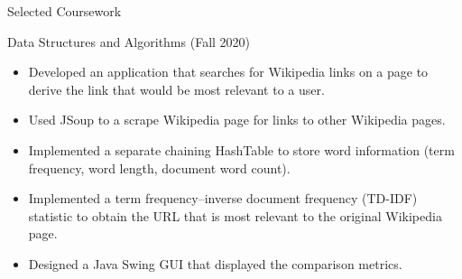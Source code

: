 \documentclass[]{johnsoncv}
\begin{document}
\begin{cvsection}{Selected Coursework}
		\begin{cvsubsection}{Data Structures and Algorithms (Fall 2020)}{}{}
			\begin{itemize}
				\item Developed an application that searches for Wikipedia links on a page to derive the link that would be most relevant to a user.
				\item Used JSoup to a scrape Wikipedia page for links to other Wikipedia pages.
				\item Implemented a separate chaining HashTable to store word information (term frequency, word length, document word count).
				\item Implemented a term frequency–inverse document frequency (TD-IDF) statistic to obtain the URL that is most relevant to the original Wikipedia page.
				\item Designed a Java Swing GUI that displayed the comparison metrics.
			\end{itemize}
		\end{cvsubsection}
	


	\end{cvsection}
\end{document}
